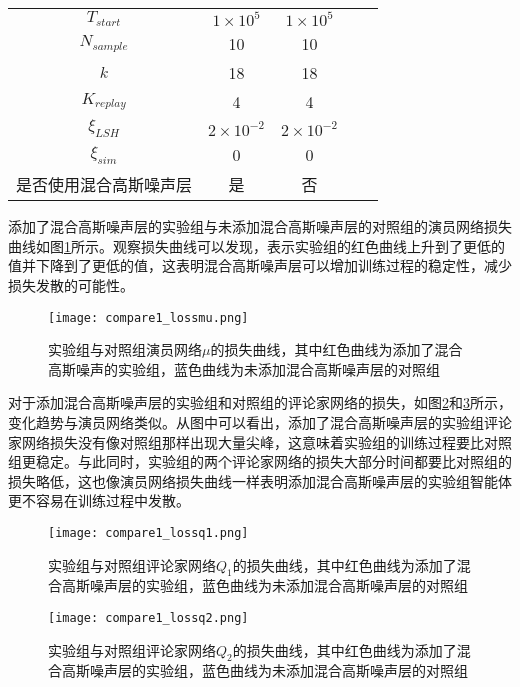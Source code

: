 \begin{table}[htbp]
\begin{tabular}{ccccc}
        $T_{start}$             & $1\times 10^5$    & $1\times 10^5$    \\
        $N_{sample}$            & 10                & 10                \\
        $k$                     & 18                & 18                \\
        $K_{replay}$            & 4                 & 4                 \\
        $\xi_{LSH}$             & $2\times 10^{-2}$ & $2\times 10^{-2}$ \\
        $\xi_{sim}$             & 0                 & 0                 \\
        是否使用混合高斯噪声层  & 是                & 否                \\
    \bottomrule[1.5pt]
    \end{tabular}
    \end{table}

添加了混合高斯噪声层的实验组与未添加混合高斯噪声层的对照组的演员网络损失曲线如图\ref{cmp1lossmu}所示。观察损失曲线可以发现，表示实验组的红色曲线上升到了更低的值并下降到了更低的值，这表明混合高斯噪声层可以增加训练过程的稳定性，减少损失发散的可能性。

        \begin{figure}[htpb]
        \centering
        \texttt{[image: compare1\_lossmu.png]}
        \caption{实验组与对照组演员网络$\mu$的损失曲线，其中红色曲线为添加了混合高斯噪声的实验组，蓝色曲线为未添加混合高斯噪声层的对照组}
            \label{cmp1lossmu}
        \end{figure}

对于添加混合高斯噪声层的实验组和对照组的评论家网络的损失，如图\ref{cmp1lossq1}和\ref{cmp1lossq2}所示，变化趋势与演员网络类似。从图中可以看出，添加了混合高斯噪声层的实验组评论家网络损失没有像对照组那样出现大量尖峰，这意味着实验组的训练过程要比对照组更稳定。与此同时，实验组的两个评论家网络的损失大部分时间都要比对照组的损失略低，这也像演员网络损失曲线一样表明添加混合高斯噪声层的实验组智能体更不容易在训练过程中发散。
        \begin{figure}[htpb]
        \centering
        \texttt{[image: compare1\_lossq1.png]}
        \caption{实验组与对照组评论家网络$Q_1$的损失曲线，其中红色曲线为添加了混合高斯噪声层的实验组，蓝色曲线为未添加混合高斯噪声层的对照组}
            \label{cmp1lossq1}
        \end{figure}

        \begin{figure}[htpb]
        \centering
        \texttt{[image: compare1\_lossq2.png]}
        \caption{实验组与对照组评论家网络$Q_2$的损失曲线，其中红色曲线为添加了混合高斯噪声层的实验组，蓝色曲线为未添加混合高斯噪声层的对照组}
            \label{cmp1lossq2}
        \end{figure}

